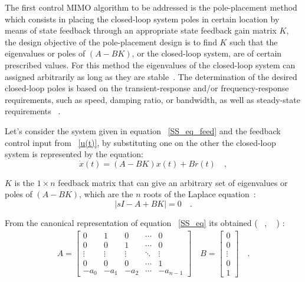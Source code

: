 The first control MIMO algorithm to be addressed  is the pole-placement method which consists in placing the closed-loop system poles in certain location by means of state feedback through an appropriate state feedback gain matrix $K$, the design objective of the pole-placement design is to find  $K$ such that the eigenvalues or poles of $(A-BK)$, or the closed-loop system, are of certain prescribed values. For this method the eigenvalues of the closed-loop system can assigned arbitrarily  as long as they are stable~\cite[Chapter~10]{Golnaraghi2010}. The  determination of the desired closed-loop poles is based on the transient-response and/or frequency-response requirements, such as speed, damping ratio, or bandwidth, as well as steady-state requirements ~\cite[Chapter~10]{Ogata2009}.
\smallskip

Let's consider the system given in equation ~\ref{SS_eq_feed} and the feedback control input from ~\ref{u(t)}, by substituting one on the other the closed-loop system is represented by the equation:
\begin{equation}
	\dot{x}(t)=(A-BK)x(t) + Br(t)	\quad ,
\end{equation}

 $K$ is the $1\times n$ feedback matrix that can give an arbitrary set of eigenvalues or poles of $(A-BK)$, which are the $n$ roots of the Laplace equation~\cite[Chapter~10]{Golnaraghi2010}:
\begin{equation}
	|sI-A+BK|=0 \quad.
\end{equation}

 From the canonical representation of equation ~\ref{SS_eq} its obtained (~\cite[Chapter~10]{Golnaraghi2010} , ~\cite[Chapter~4]{Chen1999} ) :
 \begin{align}
 A=\begin{bmatrix}
 0& 1& 0 & \cdots & 0\\
 0 & 0 & 1 & \cdots & 0\\
 \vdots & \vdots & \vdots &\ddots & \vdots \\
 0 & 0 & 0 & \cdots & 1 \\
 -a_0 & -a_1 & -a_2 & \cdots & -a_{n-1}
 \end{bmatrix} \quad
 B=\begin{bmatrix}
 0 \\ 0 \\ \vdots \\ 0 \\ 1
 \end{bmatrix} \quad .
 \end{align}

